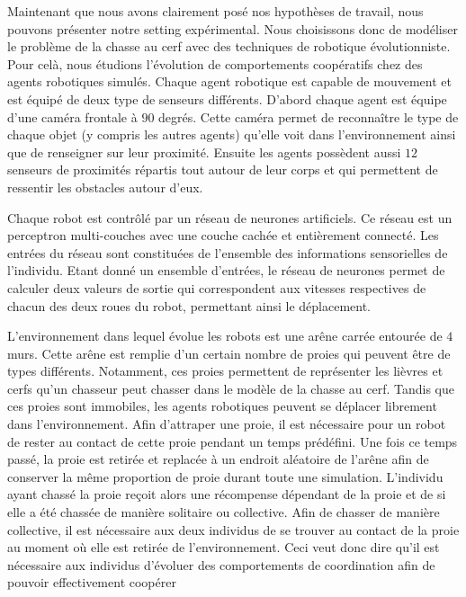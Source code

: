    	Maintenant que nous avons clairement posé nos hypothèses de travail, nous pouvons présenter notre setting expérimental. Nous choisissons donc de modéliser le problème de la chasse au cerf avec des techniques de robotique évolutionniste. Pour celà, nous étudions l'évolution de comportements coopératifs chez des agents robotiques simulés. Chaque agent robotique est capable de mouvement et est équipé de deux type de senseurs différents. D'abord chaque agent est équipe d'une caméra frontale à $90$ degrés. Cette caméra permet de reconnaître le type de chaque objet (y compris les autres agents) qu'elle voit dans l'environnement ainsi que de renseigner sur leur proximité. Ensuite les agents possèdent aussi $12$ senseurs de proximités répartis tout autour de leur corps et qui permettent de ressentir les obstacles autour d'eux.

   	Chaque robot est contrôlé par un réseau de neurones artificiels. Ce réseau est un perceptron multi-couches avec une couche cachée et entièrement connecté. Les entrées du réseau sont constituées de l'ensemble des informations sensorielles de l'individu. Etant donné un ensemble d'entrées, le réseau de neurones permet de calculer deux valeurs de sortie qui correspondent aux vitesses respectives de chacun des deux roues du robot, permettant ainsi le déplacement.

   	L'environnement dans lequel évolue les robots est une arêne carrée entourée de $4$ murs. Cette arêne est remplie d'un certain nombre de proies qui peuvent être de types différents. Notamment, ces proies permettent de représenter les lièvres et cerfs qu'un chasseur peut chasser dans le modèle de la chasse au cerf. Tandis que ces proies sont immobiles, les agents robotiques peuvent se déplacer librement dans l'environnement. Afin d'attraper une proie, il est nécessaire pour un robot de rester au contact de cette proie pendant un temps prédéfini. Une fois ce temps passé, la proie est retirée et replacée à un endroit aléatoire de l'arêne afin de conserver la même proportion de proie durant toute une simulation. L'individu ayant chassé la proie reçoit alors une récompense dépendant de la proie et de si elle a été chassée de manière solitaire ou collective. Afin de chasser de manière collective, il est nécessaire aux deux individus de se trouver au contact de la proie au moment où elle est retirée de l'environnement. Ceci veut donc dire qu'il est nécessaire aux individus d'évoluer des comportements de coordination afin de pouvoir effectivement coopérer

